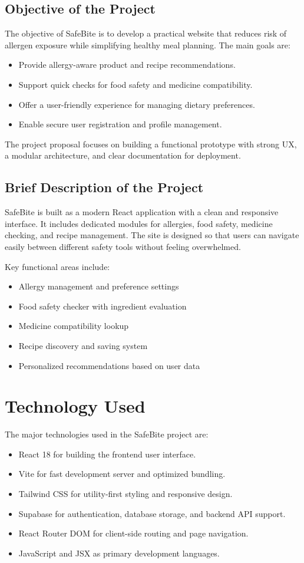 \documentclass[12pt,a4paper]{report}
\begin{document}
\section{Objective of the Project}
The objective of SafeBite is to develop a practical website that reduces risk of allergen exposure while simplifying healthy meal planning. The main goals are:
\begin{itemize}
  \item Provide allergy-aware product and recipe recommendations.
  \item Support quick checks for food safety and medicine compatibility.
  \item Offer a user-friendly experience for managing dietary preferences.
  \item Enable secure user registration and profile management.
\end{itemize}

The project proposal focuses on building a functional prototype with strong UX, a modular architecture, and clear documentation for deployment.

\section{Brief Description of the Project}
SafeBite is built as a modern React application with a clean and responsive interface. It includes dedicated modules for allergies, food safety, medicine checking, and recipe management. The site is designed so that users can navigate easily between different safety tools without feeling overwhelmed.

Key functional areas include:
\begin{itemize}
  \item Allergy management and preference settings
  \item Food safety checker with ingredient evaluation
  \item Medicine compatibility lookup
  \item Recipe discovery and saving system
  \item Personalized recommendations based on user data
\end{itemize}

\chapter{Technology Used}
The major technologies used in the SafeBite project are:
\begin{itemize}
  \item React 18 for building the frontend user interface.
  \item Vite for fast development server and optimized bundling.
  \item Tailwind CSS for utility-first styling and responsive design.
  \item Supabase for authentication, database storage, and backend API support.
  \item React Router DOM for client-side routing and page navigation.
  \item JavaScript and JSX as primary development languages.
\end{itemize}
\end{document}
